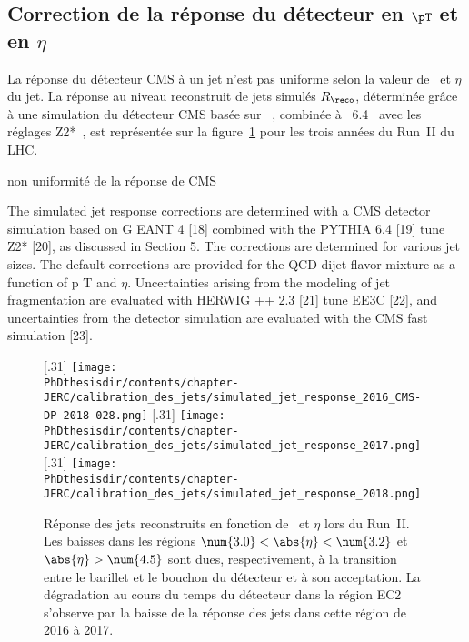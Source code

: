 \subsection{Correction de la réponse du détecteur en $\pT$ et en $\eta$}\label{chapter-JERC-section-CMS-subsec-reponse}
La réponse du détecteur CMS à un jet n'est pas uniforme selon la valeur de \pT\ et $\eta$ du jet.
La réponse au niveau reconstruit de jets simulés $R_\reco$,
déterminée grâce à une simulation du détecteur CMS basée sur \GEANTfour~\cite{geant4},
combinée à \PYTHIA~6.4~\cite{pythia6.4}
avec les réglages Z2*~\cite{Khachatryan:2015pea},
est représentée sur la figure~\ref{fig-simulated_jet_response_RunII} pour les trois années du Run~II du LHC.

non uniformité de la réponse de CMS

The simulated jet response corrections are determined with a CMS detector simulation based
on G EANT 4 [18] combined with the PYTHIA 6.4 [19] tune Z2* [20], as discussed in Section 5.
The corrections are determined for various jet sizes. The default corrections are provided for
the QCD dijet flavor mixture as a function of p T and $\eta$. Uncertainties arising from the modeling
of jet fragmentation are evaluated with HERWIG ++ 2.3 [21] tune EE3C [22], and uncertainties
from the detector simulation are evaluated with the CMS fast simulation [23].

\begin{figure}[h]
\centering
{}[.31\textwidth]
{\texttt{[image: \\PhDthesisdir/contents/chapter-JERC/calibration\_des\_jets/simulated\_jet\_response\_2016\_CMS-DP-2018-028.png]}}
\hfill
{}[.31\textwidth]
{\texttt{[image: \\PhDthesisdir/contents/chapter-JERC/calibration\_des\_jets/simulated\_jet\_response\_2017.png]}}
\hfill
{}[.31\textwidth]
{\texttt{[image: \\PhDthesisdir/contents/chapter-JERC/calibration\_des\_jets/simulated\_jet\_response\_2018.png]}}
\caption{Réponse des jets reconstruits en fonction de \pT\ et $\eta$ lors du Run~II. Les baisses dans les régions $\num{3.0}<\abs{\eta}<\num{3.2}$ et $\abs{\eta}>\num{4.5}$ sont dues, respectivement, à la transition entre le barillet et le bouchon du détecteur et à son acceptation. La dégradation au cours du temps du détecteur dans la région \og EC2 \fg{} s'observe par la baisse de la réponse des jets dans cette région de 2016 à 2017.}
\label{fig-simulated_jet_response_RunII}
\end{figure}


